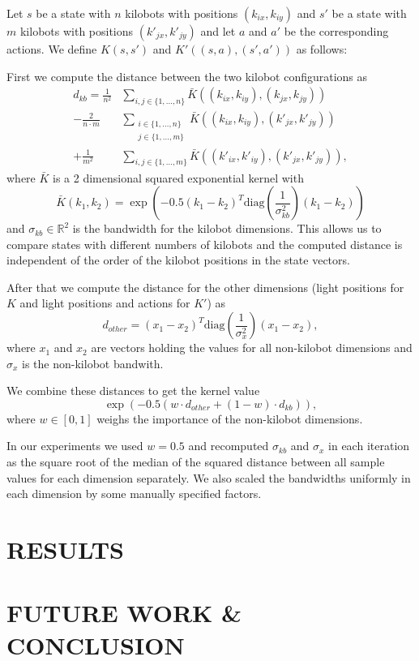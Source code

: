 \documentclass[twoside]{article}
\begin{document}
Let $s$ be a state with $n$ kilobots with positions $(k_{ix}, k_{iy})$
and $s'$ be a state with $m$ kilobots with positions $(k'_{jx}, k'_{jy})$ and
let $a$ and $a'$ be the corresponding actions.
We define $K(s, s')$ and $K'((s, a), (s', a'))$ as follows:

First we compute the distance between the two kilobot configurations as
\begin{align*}
d_{kb} =
  \frac{1}{n^2} &\sum_{i,j \in \{1,\dots,n\}}
    \bar{K}((k_{ix}, k_{iy}), (k_{jx}, k_{jy})) \\
- \frac{2}{n \cdot m} &\sum_{\substack{i \in \{1,\dots,n\}\\j \in \{1,\dots,m\}}}
    \bar{K}((k_{ix}, k_{iy}), (k'_{jx}, k'_{jy})) \\
+ \frac{1}{m^2} &\sum_{i,j \in \{1,\dots,m\}}
    \bar{K}((k'_{ix}, k'_{iy}), (k'_{jx}, k'_{jy})),
\end{align*}
where $\bar{K}$ is a 2 dimensional squared exponential kernel with
$$
\bar{K}(k_1, k_2) =
    \exp \left(-0.5 (k_1 - k_2)^T
    \mathrm{diag}\left(\frac{1}{\sigma_{kb}^2}\right) (k_1 - k_2)\right)
$$
and $\sigma_{kb} \in \mathbb{R}^2$ is the bandwidth for the kilobot dimensions.
This allows us to compare states with different numbers of kilobots and the
computed distance is independent of the order of the kilobot positions in the
state vectors.

After that we compute the distance for the other dimensions (light positions for
$K$ and light positions and actions for $K'$) as
$$
d_{other} = (x_1 - x_2)^T \mathrm{diag}\left(\frac{1}{\sigma_{x}^2}\right) (x_1 - x_2),
$$
where $x_1$ and $x_2$ are vectors holding the values for all non-kilobot
dimensions and $\sigma_x$ is the non-kilobot bandwith.

We combine these distances to get the kernel value
$$
\exp(-0.5 (w \cdot d_{other} + (1 - w) \cdot d_{kb})),
$$
where $w \in [0,1]$ weighs the importance of the non-kilobot dimensions.

In our experiments we used $w = 0.5$ and recomputed $\sigma_{kb}$ and $\sigma_x$
in each iteration as the square root of the median of the squared distance
between all sample values for each dimension separately. We also scaled the
bandwidths uniformly in each dimension by some manually specified factors.

\section{RESULTS}



\section{FUTURE WORK \& CONCLUSION}




\end{document}
